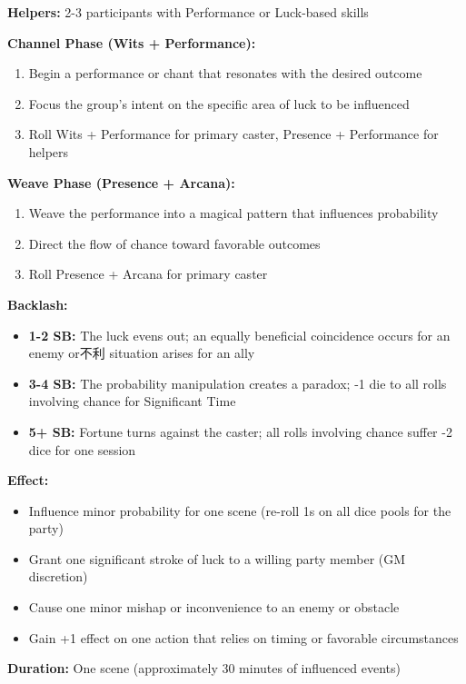 \textbf{Helpers:} 2-3 participants with Performance or Luck-based skills

\textbf{Channel Phase (Wits + Performance):}
\begin{enumerate}
\item Begin a performance or chant that resonates with the desired outcome
\item Focus the group's intent on the specific area of luck to be influenced
\item Roll Wits + Performance for primary caster, Presence + Performance for helpers
\end{enumerate}

\textbf{Weave Phase (Presence + Arcana):}
\begin{enumerate}
\item Weave the performance into a magical pattern that influences probability
\item Direct the flow of chance toward favorable outcomes
\item Roll Presence + Arcana for primary caster
\end{enumerate}

\textbf{Backlash:}
\begin{itemize}
\item \textbf{1-2 SB:} The luck evens out; an equally beneficial coincidence occurs for an enemy or不利 situation arises for an ally
\item \textbf{3-4 SB:} The probability manipulation creates a paradox; -1 die to all rolls involving chance for Significant Time
\item \textbf{5+ SB:} Fortune turns against the caster; all rolls involving chance suffer -2 dice for one session
\end{itemize}

\textbf{Effect:}
\begin{itemize}
\item Influence minor probability for one scene (re-roll 1s on all dice pools for the party)
\item Grant one significant stroke of luck to a willing party member (GM discretion)
\item Cause one minor mishap or inconvenience to an enemy or obstacle
\item Gain +1 effect on one action that relies on timing or favorable circumstances
\end{itemize}

\textbf{Duration:} One scene (approximately 30 minutes of influenced events)

